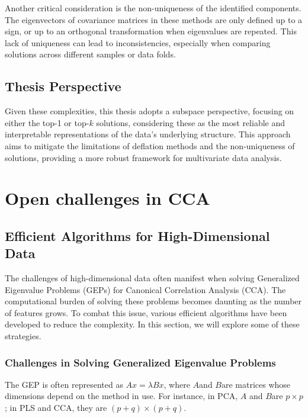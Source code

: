 Another critical consideration is the non-uniqueness of the identified components.
The eigenvectors of covariance matrices in these methods are only defined up to a sign, or up to an orthogonal transformation when eigenvalues are repeated. This lack of uniqueness can lead to inconsistencies, especially when comparing solutions across different samples or data folds.

\subsection{Thesis Perspective}

Given these complexities, this thesis adopts a subspace perspective, focusing on either the top-1 or top-$k$ solutions, considering these as the most reliable and interpretable representations of the data's underlying structure.
This approach aims to mitigate the limitations of deflation methods and the non-uniqueness of solutions, providing a more robust framework for multivariate data analysis.

\section{Open challenges in CCA}

\subsection{Efficient Algorithms for High-Dimensional Data}

The challenges of high-dimensional data often manifest when solving Generalized Eigenvalue Problems (GEPs) for Canonical Correlation Analysis (CCA). The computational burden of solving these problems becomes daunting as the number of features grows. To combat this issue, various efficient algorithms have been developed to reduce the complexity. In this section, we will explore some of these strategies.

\subsubsection{Challenges in Solving Generalized Eigenvalue Problems}

The GEP is often represented as \( Ax = \lambda Bx \), where \( A \)and \( B \)are matrices whose dimensions depend on the method in use.
For instance, in PCA, \( A \) and \( B \)are \( p \times p \); in PLS and CCA, they are \( (p+q) \times (p+q) \).

